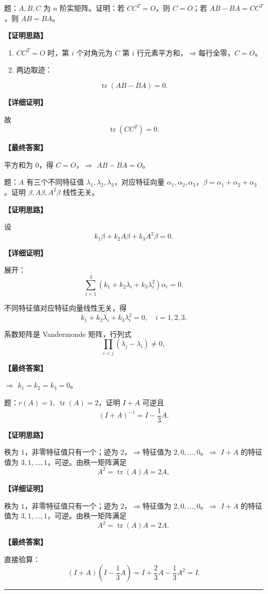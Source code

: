 ﻿\documentclass[11pt,a4paper,UTF8]{ctexart}
\begin{document}
\begin{answerbox}[2023--2024 证明二：\ensuremath{CC^T=O} 与迹技巧]
题：$A,B,C$ 为 $n$ 阶实矩阵。证明：若 $CC^T=O$，则 $C=O$；若 $AB-BA=CC^T$，则 $AB=BA$。

\textbf{【证明思路】}

\begin{enumerate}
\item $CC^T=O$ 时，第 $i$ 个对角元为 $C$ 第 $i$ 行元素平方和，$\Rightarrow$每行全零，$C=O$。
\item 两边取迹：
\end{enumerate}
\[\operatorname{tr}(AB-BA)=0.\]

\textbf{【详细证明】}

故
\[\operatorname{tr}(CC^T)=0.\]

\textbf{【最终答案】}

平方和为 $0$，得 $C=O$，$\Rightarrow$ $AB-BA=O$。
\end{answerbox}
\begin{answerbox}
题：$A$ 有三个不同特征值 $\lambda_1,\lambda_2,\lambda_3$，对应特征向量 $\alpha_1,\alpha_2,\alpha_3$，$\beta=\alpha_1+\alpha_2+\alpha_3$。证明 $\beta,A\beta,A^2\beta$ 线性无关。

\textbf{【证明思路】}

设
\[k_1\beta+k_2A\beta+k_3A^2\beta=0.\]

\textbf{【详细证明】}

展开：
\[\sum_{i=1}^3(k_1+k_2\lambda_i+k_3\lambda_i^2)\alpha_i=0.\]

不同特征值对应特征向量线性无关，得
\[k_1+k_2\lambda_i+k_3\lambda_i^2=0,\quad i=1,2,3.\]

系数矩阵是 Vandermonde 矩阵，行列式
\[\prod_{i<j}(\lambda_j-\lambda_i)\ne0,\]

\textbf{【最终答案】}

$\Rightarrow$ $k_1=k_2=k_3=0$。
\end{answerbox}
\begin{answerbox}
题：$r(A)=1,\ \operatorname{tr}(A)=2$，证明 $I+A$ 可逆且
\[(I+A)^{-1}=I-\frac13A.\]

\textbf{【证明思路】}

秩为 $1$，非零特征值只有一个；迹为 $2$，$\Rightarrow$特征值为 $2,0,\ldots,0$。$\Rightarrow$ $I+A$ 的特征值为 $3,1,\ldots,1$，可逆。由秩一矩阵满足
\[A^2=\operatorname{tr}(A)A=2A,\]

\textbf{【详细证明】}

秩为 $1$，非零特征值只有一个；迹为 $2$，$\Rightarrow$特征值为 $2,0,\ldots,0$。$\Rightarrow$ $I+A$ 的特征值为 $3,1,\ldots,1$，可逆。由秩一矩阵满足
\[A^2=\operatorname{tr}(A)A=2A,\]

\textbf{【最终答案】}

直接验算：
\[
(I+A)\left(I-\frac13A\right)
=I+\frac23A-\frac13A^2
=I.
\]
\end{answerbox}
\bigskip\hrule\bigskip
\end{document}
